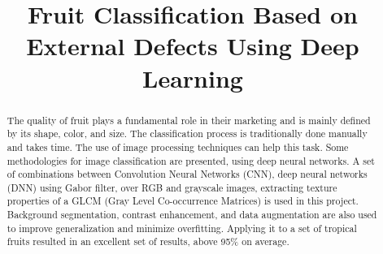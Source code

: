 \documentclass{cta-author}%
\begin{document}
\title{Fruit Classification Based on External Defects Using Deep Learning}

\author{%
}

\address{%
    }

\begin{abstract} %
    The quality of fruit plays a fundamental role in their marketing and is mainly defined by its shape, color, and size. The classification process is traditionally done manually and takes time. The use of image processing techniques can help this task. Some methodologies for image classification are presented, using deep neural networks. A set of combinations between Convolution Neural Networks (CNN), deep neural networks (DNN) using Gabor filter, over RGB and grayscale images, extracting texture properties of a GLCM (Gray Level Co-occurrence Matrices) is used in this project. Background segmentation, contrast enhancement, and data augmentation are also used to improve generalization and minimize overfitting. Applying it to a set of tropical fruits resulted in an excellent set of results, above 95\% on average.
\end{abstract}

\maketitle




% 








% 



\end{document}
